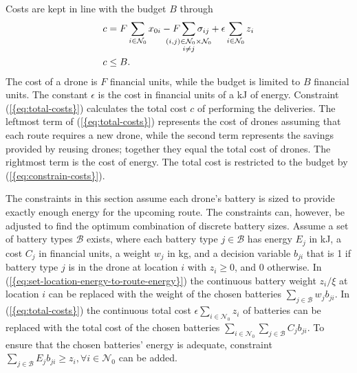 \documentclass[journal]{IEEEtran}
\begin{document}
Costs are kept in line with the budget ${\ensuremath{B}}$ through
\begin{subequations}
\label{eq:cost-constraints}
\begin{align}
& {\ensuremath{c}} = {\ensuremath{F}} \sum_{i \in {\ensuremath{{\ensuremath{\mathcal{N}}}_{0}}}} {\ensuremath{x_{{0} {i}}}} - {\ensuremath{F}} \sum_{\mathclap{ \substack{(i,j) \in {\ensuremath{{\ensuremath{\mathcal{N}}}_{0}}} \times {\ensuremath{{\ensuremath{\mathcal{N}}}_{0}}} \\ i \neq j}}} {\ensuremath{\sigma_{{i} {j}}}} + {\ensuremath{\epsilon}} \sum_{i \in {\ensuremath{{\ensuremath{\mathcal{N}}}_{0}}}} {\ensuremath{z_{{i}}}} \label{eq:total-costs} \\
& {\ensuremath{c}} \leq {\ensuremath{B}}. \label{eq:constrain-costs}
\end{align}
\end{subequations}
The cost of a drone is ${\ensuremath{F}}$ financial units, while the budget is limited to ${\ensuremath{B}}$ financial units. The constant ${\ensuremath{\epsilon}}$ is the cost in financial units of a kJ of energy. Constraint {(\ref{{eq:total-costs}})} calculates the total cost ${\ensuremath{c}}$ of performing the deliveries. The leftmost term of {(\ref{{eq:total-costs}})} represents the cost of drones assuming that each route requires a new drone, while the second term represents the savings provided by reusing drones; together they equal the total cost of drones. The rightmost term is the cost of energy. The total cost is restricted to the budget by {(\ref{{eq:constrain-costs}})}.

The constraints in this section assume each drone's battery is sized to provide exactly enough energy for the upcoming route. The constraints can, however, be adjusted to find the optimum combination of discrete battery sizes. Assume a set of battery types ${\ensuremath{\mathcal{B}}}$ exists, where each battery type $j\in{\ensuremath{\mathcal{B}}}$ has energy ${\ensuremath{E_{{j}}}}$ in kJ, a cost ${\ensuremath{C_{{j}}}}$ in financial units, a weight ${\ensuremath{w_{{j}}}}$ in kg, and a decision variable ${\ensuremath{b_{{j} {i}}}}$ that is 1 if battery type $j$ is in the drone at location $i$ with ${\ensuremath{z_{{i}}}}\ge0$, and 0 otherwise. In {(\ref{{eq:set-location-energy-to-route-energy}})} the continuous battery weight ${\ensuremath{z_{{i}}}}/{\ensuremath{\xi}}$ at location $i$ can be replaced with the weight of the chosen batteries ${\ensuremath{\sum_{{j} \in {\ensuremath{\mathcal{B}}}}}}{\ensuremath{w_{{j}}}}{\ensuremath{b_{{j} {i}}}}$. In {(\ref{{eq:total-costs}})} the continuous total cost ${\ensuremath{\epsilon}} \sum_{i \in {\ensuremath{{\ensuremath{\mathcal{N}}}_{0}}}} {\ensuremath{z_{{i}}}}$ of batteries can be replaced with the total cost of the chosen batteries $\sum_{i \in {\ensuremath{{\ensuremath{\mathcal{N}}}_{0}}}}{\ensuremath{\sum_{{j} \in {\ensuremath{\mathcal{B}}}}}}{\ensuremath{C_{{j}}}}{\ensuremath{b_{{j} {i}}}}$. To ensure that the chosen batteries' energy is adequate, constraint ${\ensuremath{\sum_{{j} \in {\ensuremath{\mathcal{B}}}}}}{\ensuremath{E_{{j}}}}{\ensuremath{b_{{j} {i}}}} \ge {\ensuremath{z_{{i}}}}, {\ensuremath{\forall {i} \in {\ensuremath{{\ensuremath{\mathcal{N}}}_{0}}}}}$ can be added.
\end{document}
